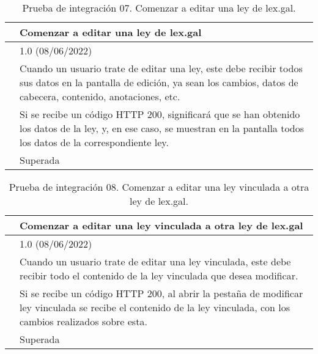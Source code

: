 \begin{table}[H]
\begin{center}
\begin{tabular}{|p{3cm}|p{10cm}|} \hline
\centering {\bf PI-07} & Comenzar a editar una ley de lex.gal  \\ \hline\hline
\centering {\bf Versión} & 1.0 (08/06/2022) \\ \hline
\centering {\bf Descripción} & Cuando un usuario trate de editar una ley, este debe recibir todos sus datos en la pantalla de edición, ya sean los cambios, datos de cabecera, contenido, anotaciones, etc. \\ \hline
\centering {\bf Criterio de aceptación} & Si se recibe un código HTTP 200, significará que se han obtenido los datos de la ley, y, en ese caso, se muestran en la pantalla todos los datos de la correspondiente ley. \\ \hline
\centering {\bf Estado} & Superada \\ \hline
\end{tabular}
\caption{Prueba de integración 07. Comenzar a editar una ley de lex.gal.}
\label{enlacePI7}
\end{center}
\end{table}

\begin{table}[H]
\begin{center}
\begin{tabular}{|p{3cm}|p{10cm}|} \hline
\centering {\bf PI-08} & Comenzar a editar una ley vinculada a otra ley de lex.gal  \\ \hline\hline
\centering {\bf Versión} & 1.0 (08/06/2022) \\ \hline
\centering {\bf Descripción} & Cuando un usuario trate de editar una ley vinculada, este debe recibir todo el contenido de la ley vinculada que desea modificar. \\ \hline
\centering {\bf Criterio de aceptación} & Si se recibe un código HTTP 200, al abrir la pestaña de modificar ley vinculada se recibe el contenido de la ley vinculada, con los cambios realizados sobre esta. \\ \hline
\centering {\bf Estado} & Superada \\ \hline
\end{tabular}
\caption{Prueba de integración 08. Comenzar a editar una ley vinculada a otra ley de lex.gal.}
\label{enlacePI8}
\end{center}
\end{table}

